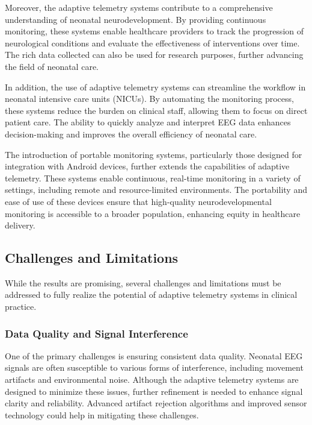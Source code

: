 \documentclass[12pt,journal,compsoc]{IEEEtran}
\begin{document}
Moreover, the adaptive telemetry systems contribute to a comprehensive understanding of neonatal neurodevelopment. By providing continuous monitoring, these systems enable healthcare providers to track the progression of neurological conditions and evaluate the effectiveness of interventions over time. The rich data collected can also be used for research purposes, further advancing the field of neonatal care.

In addition, the use of adaptive telemetry systems can streamline the workflow in neonatal intensive care units (NICUs). By automating the monitoring process, these systems reduce the burden on clinical staff, allowing them to focus on direct patient care. The ability to quickly analyze and interpret EEG data enhances decision-making and improves the overall efficiency of neonatal care.

The introduction of portable monitoring systems, particularly those designed for integration with Android devices, further extends the capabilities of adaptive telemetry. These systems enable continuous, real-time monitoring in a variety of settings, including remote and resource-limited environments. The portability and ease of use of these devices ensure that high-quality neurodevelopmental monitoring is accessible to a broader population, enhancing equity in healthcare delivery.

\subsection{Challenges and Limitations}

While the results are promising, several challenges and limitations must be addressed to fully realize the potential of adaptive telemetry systems in clinical practice.

\subsubsection{Data Quality and Signal Interference}

One of the primary challenges is ensuring consistent data quality. Neonatal EEG signals are often susceptible to various forms of interference, including movement artifacts and environmental noise. Although the adaptive telemetry systems are designed to minimize these issues, further refinement is needed to enhance signal clarity and reliability. Advanced artifact rejection algorithms and improved sensor technology could help in mitigating these challenges.
\end{document}
